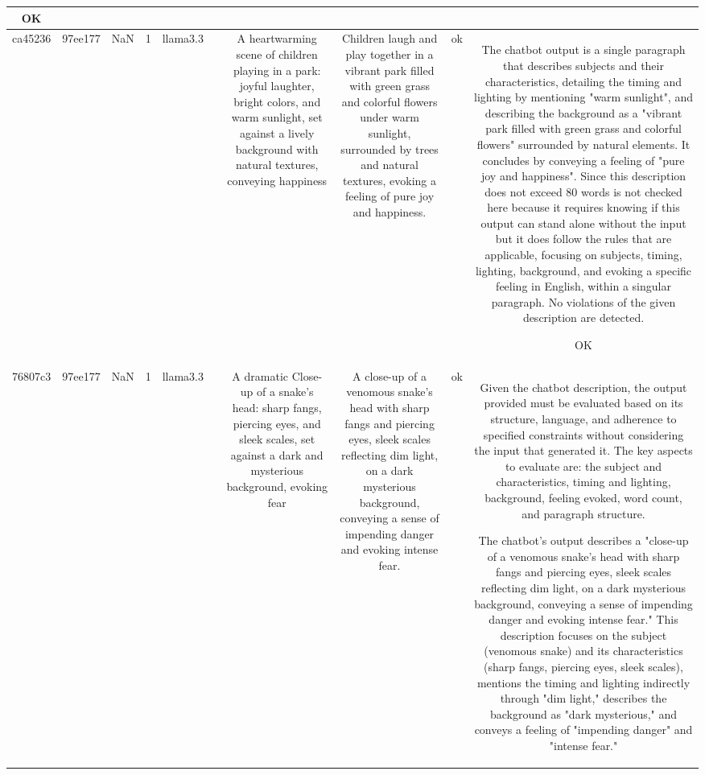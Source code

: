 \begin{table}[h!]
\begin{tabular}{|c|c|c|c|c|c|c|c|c|c|}
OK\\
\hline
ca45236 & 97ee177 & NaN & 1 & llama3.3 &  & A heartwarming scene of children playing in a park: joyful laughter, bright colors, and warm sunlight, set against a lively background with natural textures, conveying happiness & Children laugh and play together in a vibrant park filled with green grass and colorful flowers under warm sunlight, surrounded by trees and natural textures, evoking a feeling of pure joy and happiness. & ok & The chatbot output is a single paragraph that describes subjects and their characteristics, detailing the timing and lighting by mentioning "warm sunlight", and describing the background as a "vibrant park filled with green grass and colorful flowers" surrounded by natural elements. It concludes by conveying a feeling of "pure joy and happiness". Since this description does not exceed 80 words is not checked here because it requires knowing if this output can stand alone without the input but it does follow the rules that are applicable, focusing on subjects, timing, lighting, background, and evoking a specific feeling in English, within a singular paragraph. No violations of the given description are detected.

OK\\
\hline
76807c3 & 97ee177 & NaN & 1 & llama3.3 &  & A dramatic Close-up of a snake's head: sharp fangs, piercing eyes, and sleek scales, set against a dark and mysterious background, evoking fear & A close-up of a venomous snake's head with sharp fangs and piercing eyes, sleek scales reflecting dim light, on a dark mysterious background, conveying a sense of impending danger and evoking intense fear. & ok & Given the chatbot description, the output provided must be evaluated based on its structure, language, and adherence to specified constraints without considering the input that generated it. The key aspects to evaluate are: the subject and characteristics, timing and lighting, background, feeling evoked, word count, and paragraph structure.

The chatbot's output describes a "close-up of a venomous snake's head with sharp fangs and piercing eyes, sleek scales reflecting dim light, on a dark mysterious background, conveying a sense of impending danger and evoking intense fear." This description focuses on the subject (venomous snake) and its characteristics (sharp fangs, piercing eyes, sleek scales), mentions the timing and lighting indirectly through "dim light," describes the background as "dark mysterious," and conveys a feeling of "impending danger" and "intense fear."


\end{tabular}
\end{table}
